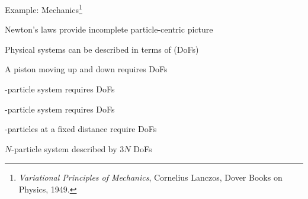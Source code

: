 \begin{frame}[fragile]{Example: Mechanics\footnote{{\it Variational Principles of Mechanics}, Cornelius Lanczos, Dover Books on Physics, 1949.}}

\begin{itemize}

\mitem Newton's laws provide incomplete particle-centric picture

\mitem Physical systems can be described in terms of  (DoFs)

\begin{itemize}

\sitem A piston moving up and down requires  DoFs

-particle system requires  DoFs

-particle system requires  DoFs

-particles at a fixed distance require  DoFs

\end{itemize}

\mitem $N$-particle system  described by $3N$ DoFs

\end{itemize}

\end{frame}

